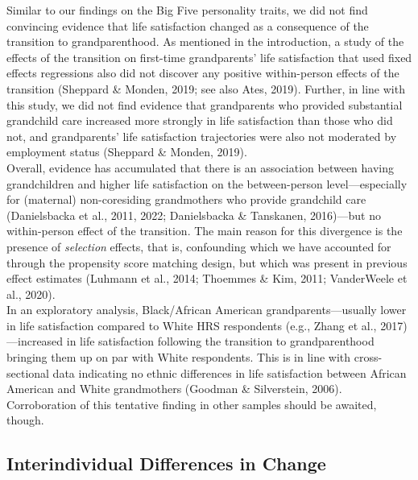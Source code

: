 \documentclass[
  english,
  man,floatsintext]{apa7}
\begin{document}
Similar to our findings on the Big Five personality traits, we did not find convincing evidence that life satisfaction changed as a consequence of the transition to grandparenthood. As mentioned in the introduction, a study of the effects of the transition on first-time grandparents' life satisfaction that used fixed effects regressions also did not discover any positive within-person effects of the transition (Sheppard \& Monden, 2019; see also Ates, 2019). Further, in line with this study, we did not find evidence that grandparents who provided substantial grandchild care increased more strongly in life satisfaction than those who did not, and grandparents' life satisfaction trajectories were also not moderated by employment status (Sheppard \& Monden, 2019).\\
Overall, evidence has accumulated that there is an association between having grandchildren and higher life satisfaction on the between-person level---especially for (maternal) non-coresiding grandmothers who provide grandchild care (Danielsbacka et al., 2011, 2022; Danielsbacka \& Tanskanen, 2016)---but no within-person effect of the transition. The main reason for this divergence is the presence of \emph{selection} effects, that is, confounding which we have accounted for through the propensity score matching design, but which was present in previous effect estimates (Luhmann et al., 2014; Thoemmes \& Kim, 2011; VanderWeele et al., 2020).\\
In an exploratory analysis, Black/African American grandparents---usually lower in life satisfaction compared to White HRS respondents (e.g., Zhang et al., 2017)---increased in life satisfaction following the transition to grandparenthood bringing them up on par with White respondents. This is in line with cross-sectional data indicating no ethnic differences in life satisfaction between African American and White grandmothers (Goodman \& Silverstein, 2006). Corroboration of this tentative finding in other samples should be awaited, though.

\hypertarget{interindividual-differences-in-change-1}{%
\subsection{Interindividual Differences in Change}\label{interindividual-differences-in-change-1}}
\end{document}
